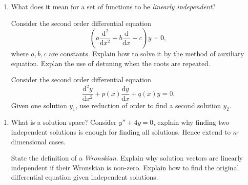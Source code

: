 \documentclass[11pt]{article}
\newlength{\qspace}
\newcounter{qnumber}
\newenvironment{question}%
 {\vspace{\qspace}
  \begin{enumerate}[\bfseries 1\quad][10]%
    \setcounter{enumi}{\value{qnumber}}%
    \item%
 }
{
  \end{enumerate}
  \filbreak
  \stepcounter{qnumber}
 }
\begin{document}
\begin{question}
  What does it mean for a set of functions to be \textit{linearly independent}?

  Consider the second order differential equation 
  \[
    \left( a\frac{\mathrm{d}^2}{\mathrm{d}x^2}+b \frac{\mathrm{d}}{\mathrm{d}x}+c \right)y=0,
  \]
  where $ a,b,c $ are constants. Explain how to solve it by the method of auxiliary equation. Explan the use of detuning when the roots are repeated.

  Consider the second order differential equation 
  \[
    \frac{\mathrm{d}^2y}{\mathrm{d}x^2}+p(x)\frac{\mathrm{d}y}{\mathrm{d}x} +q(x)y=0.
  \]
  Given one solution $y_1$, use reduction of order to find a second solution $y_2$.
\end{question}

\begin{question}
  What is a solution space? Consider $ y''+4y=0 $, explain why finding two independent solutions is enough for finding all solutions. Hence extend to $n$-dimensional cases.

  State the definition of a \textit{Wronskian}. Explain why solution vectors are linearly independent if their Wronskian is non-zero. Explain how to find the original differential equation given independent solutions.
\end{question}
\end{document}
